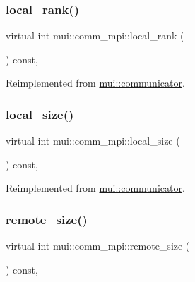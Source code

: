 \mbox{\label{classmui_1_1comm__mpi_ab0cf03ad7dbe099e0859a920f2711709}} 
\subsubsection{\texorpdfstring{local\+\_\+rank()}{local\_rank()}}
{\footnotesize\ttfamily virtual int mui\+::comm\+\_\+mpi\+::local\+\_\+rank (\begin{DoxyParamCaption}{ }\end{DoxyParamCaption}) const\hspace{0.3cm}{\ttfamily [inline]}, {\ttfamily [virtual]}}



Reimplemented from \hyperlink{classmui_1_1communicator_a83311811022225d758dd86866e620466}{mui\+::communicator}.

\mbox{\label{classmui_1_1comm__mpi_a580ce0c15f414fe6d80efa74cefa2338}} 
\subsubsection{\texorpdfstring{local\+\_\+size()}{local\_size()}}
{\footnotesize\ttfamily virtual int mui\+::comm\+\_\+mpi\+::local\+\_\+size (\begin{DoxyParamCaption}{ }\end{DoxyParamCaption}) const\hspace{0.3cm}{\ttfamily [inline]}, {\ttfamily [virtual]}}



Reimplemented from \hyperlink{classmui_1_1communicator_aa98faead0a9f63b8edb8b987477998e1}{mui\+::communicator}.

\mbox{\label{classmui_1_1comm__mpi_abbf8ab973f51af297cc7ecf145f6cd84}} 
\subsubsection{\texorpdfstring{remote\+\_\+size()}{remote\_size()}}
{\footnotesize\ttfamily virtual int mui\+::comm\+\_\+mpi\+::remote\+\_\+size (\begin{DoxyParamCaption}{ }\end{DoxyParamCaption}) const\hspace{0.3cm}{\ttfamily [inline]}, {\ttfamily [virtual]}}



